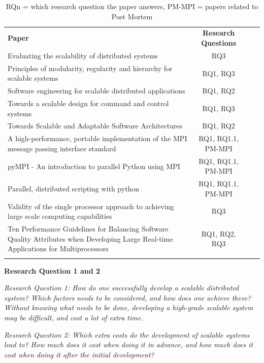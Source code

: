 \documentclass{article}
\begin{document}
\begin{table}[h!]
\begin{tabular}{p{8cm} c c r}
  \rowcolor[gray]{0.5}
  {\bf Paper} & {\bf Research Questions} \\
  Evaluating the scalability of distributed systems & RQ3 \\
  Principles of modularity, regularity and hierarchy for scalable systems & RQ1, RQ3 \\
  Software engineering for scalable distributed applications & RQ1, RQ2 \\
  Towards a scalable design for command and control systems & RQ1, RQ3 \\
  Towards Scalable and Adaptable Software Architectures & RQ1, RQ2 \\
  A high-performance, portable implementation of the MPI message passing interface standard & RQ1, RQ1.1, PM-MPI \\
  pyMPI - An introduction to parallel Python using MPI & RQ1, RQ1.1, PM-MPI \\
  Parallel, distributed scripting with python & RQ1, RQ1.1, PM-MPI \\
  Validity of the single processor approach to achieving large scale computing capabilities & RQ3 \\
  Ten Performance Guidelines for Balancing Software Quality Attributes when Developing Large Real-time Applications for Multiprocessors & RQ1, RQ2, RQ3 \\
  
\rowcolor[gray]{0.5}
\end{tabular}
\caption{RQ{n} = which research question the paper answers,
 PM-MPI = papers related to Post Mortem }
\end{table}

\textbf{Research Question 1 and 2}

{\scriptsize \emph{Research Question 1: How do one successfully develop a
scalable distributed system? Which factors needs to be considered, and how does
one achieve these? Without knowing what needs to be done, developing a
high-grade scalable system may be difficult, and cost a lot of extra time.}}

{\scriptsize \emph{Research Question 2: Which extra costs do the development of
scalable systems lead to? How much does it cost when doing it in advance, and
how much does it cost when doing it after the initial development?}}
\\
\end{document}
